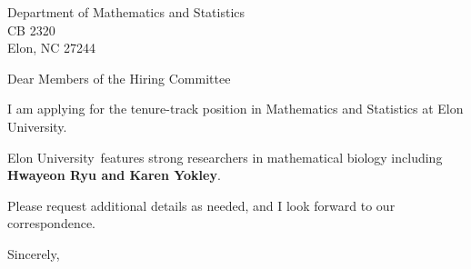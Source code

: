 




	
	
	\def\School{Elon University}
	
	\begin{letter}
		{Department of Mathematics and Statistics\\
			CB 2320\\
			Elon, NC 27244
		}
		
		\opening{Dear Members of the Hiring Committee}
		
		
		I am applying for the tenure-track position in Mathematics and Statistics at \School. 
		
		\School~features strong researchers in mathematical biology including \textbf{Hwayeon Ryu and Karen Yokley}. 
		
		
		
		
		
		Please request additional details as needed, and I look forward to our correspondence.
		
		\closing{Sincerely,}
	\end{letter}
